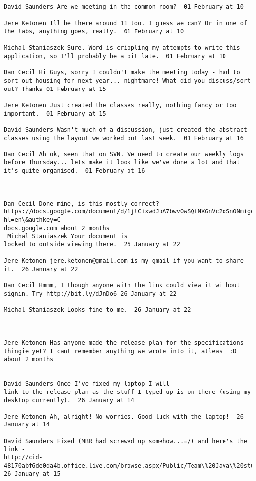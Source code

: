\begin{verbatim}
David Saunders Are we meeting in the common room?  01 February at 10

Jere Ketonen Ill be there around 11 too. I guess we can? Or in one of
the labs, anything goes, really.  01 February at 10

Michal Staniaszek Sure. Word is crippling my attempts to write this
application, so I'll probably be a bit late.  01 February at 10

Dan Cecil Hi Guys, sorry I couldn't make the meeting today - had to
sort out housing for next year... nightmare! What did you discuss/sort
out? Thanks 01 February at 15

Jere Ketonen Just created the classes really, nothing fancy or too
important.  01 February at 15

David Saunders Wasn't much of a discussion, just created the abstract
classes using the layout we worked out last week.  01 February at 16

Dan Cecil Ah ok, seen that on SVN. We need to create our weekly logs
before Thursday... lets make it look like we've done a lot and that
it's quite organised.  01 February at 16



Dan Cecil Done mine, is this mostly correct?
https://docs.google.com/document/d/1jlCixwdJpA7bwvOwSQfNXGnVc2oSnONmigeV3pKJ6VY/edit?hl=en\&authkey=C
docs.google.com about 2 months 
 Michal Staniaszek Your document is
locked to outside viewing there.  26 January at 22

Jere Ketonen jere.ketonen@gmail.com is my gmail if you want to share
it.  26 January at 22

Dan Cecil Hmmm, I though anyone with the link could view it without
signin. Try http://bit.ly/dJnDo6 26 January at 22

Michal Staniaszek Looks fine to me.  26 January at 22



Jere Ketonen Has anyone made the release plan for the specifications
thingie yet? I cant remember anything we wrote into it, atleast :D
about 2 months 
 

David Saunders Once I've fixed my laptop I will
link to the release plan as the stuff I typed up is on there (using my
desktop currently).  26 January at 14

Jere Ketonen Ah, alright! No worries. Good luck with the laptop!  26
January at 14

David Saunders Fixed (MBR had screwed up somehow...=/) and here's the
link -
http://cid-48170abf6de0da4b.office.live.com/browse.aspx/Public/Team\%20Java\%20stuffs
26 January at 15


\end{verbatim}
